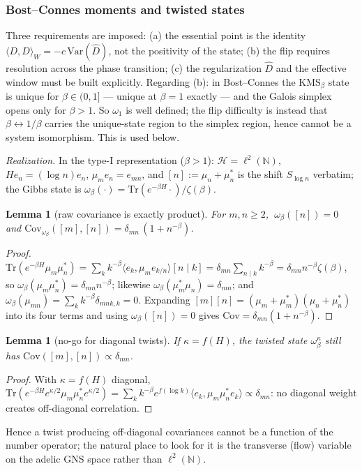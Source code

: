 \documentclass[11pt]{amsart}
\newtheorem{lemma}[theorem]{Lemma}
\theoremstyle{definition}
\theoremstyle{remark}
\theoremstyle{definition}
\newcommand{\N}{\mathbb{N}}
\begin{document}
\subsubsection*{Bost--Connes moments and twisted states}

Three requirements are imposed: (a) the essential point is the identity
$\langle D,D\rangle_W=-c\,\mathrm{Var}(\widehat D)$, not the positivity of the state; (b) the flip
requires resolution across the phase transition; (c) the regularization $\widehat D$ and the effective
window must be built explicitly.  Regarding (b): in Bost--Connes the
$\mathrm{KMS}_\beta$ state is unique for $\beta\in(0,1]$ --- unique at $\beta=1$ exactly --- and the
Galois simplex opens only for $\beta>1$.  So $\omega_1$ is well defined; the flip difficulty is instead
that $\beta\leftrightarrow1/\beta$ carries the unique-state region to the simplex region, hence cannot be
a system isomorphism.  This is used below.

\emph{Realization.}  In the type-I representation ($\beta>1$): $\mathcal H=\ell^2(\N)$, $He_n=(\log
n)e_n$, $\mu_me_n=e_{mn}$, and $[n]:=\mu_n+\mu_n^*$ is the shift $S_{\log n}$ verbatim; the Gibbs state is
$\omega_\beta(\cdot)=\mathrm{Tr}(e^{-\beta H}\cdot)/\zeta(\beta)$.

\begin{lemma}[raw covariance is exactly product]\label{lem:bc-covariance}
For $m,n\ge2$, $\ \omega_\beta([n])=0$ and
$\mathrm{Cov}_{\omega_\beta}([m],[n])=\delta_{mn}\,(1+n^{-\beta})$.
\end{lemma}
\begin{proof}
$\mathrm{Tr}(e^{-\beta H}\mu_m\mu_n^*)=\sum_k k^{-\beta}\langle e_k,\mu_m e_{k/n}\rangle[n\mid k]
=\delta_{mn}\sum_{n\mid k}k^{-\beta}=\delta_{mn}n^{-\beta}\zeta(\beta)$, so
$\omega_\beta(\mu_m\mu_n^*)=\delta_{mn}n^{-\beta}$; likewise $\omega_\beta(\mu_m^*\mu_n)=\delta_{mn}$; and
$\omega_\beta(\mu_{mn})=\sum_kk^{-\beta}\delta_{mnk,k}=0$.  Expanding
$[m][n]=(\mu_m+\mu_m^*)(\mu_n+\mu_n^*)$ into its four terms and using $\omega_\beta([n])=0$ gives
$\mathrm{Cov}=\delta_{mn}(1+n^{-\beta})$.
\end{proof}

\begin{lemma}[no-go for diagonal twists]\label{lem:bc-nogo-diagonal}
If $\kappa=f(H)$, the twisted state $\omega_\beta^\kappa$ still has
$\mathrm{Cov}([m],[n])\propto\delta_{mn}$.
\end{lemma}
\begin{proof}
With $\kappa=f(H)$ diagonal, $\mathrm{Tr}(e^{-\beta H}e^{\kappa/2}\mu_m\mu_n^*e^{\kappa/2})=\sum_k
k^{-\beta}e^{f(\log k)}\langle e_k,\mu_m\mu_n^*e_k\rangle\propto\delta_{mn}$: no diagonal weight creates
off-diagonal correlation.
\end{proof}
\noindent Hence a twist producing off-diagonal covariances cannot be a function of the number operator;
the natural place to look for it is the transverse (flow) variable on the adelic GNS space rather than
$\ell^2(\N)$.
\end{document}
